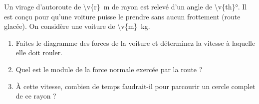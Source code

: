 Un virage d'autoroute de \qty{\v{r}}{m} de rayon est relevé d'un angle de \ang{\v{th}}. Il est conçu pour qu'une voiture puisse le prendre sans aucun frottement (route glacée). On considère une voiture de \qty{\v{m}}{kg}.

\begin{enumerate}[label=\alph*)]
    \item Faites le diagramme des forces de la voiture et déterminez la vitesse à laquelle elle doit rouler.
    \item Quel est le module de la force normale exercée par la route ?
    \item À cette vitesse, combien de temps faudrait-il pour parcourir un cercle complet de ce rayon ?
\end{enumerate}
